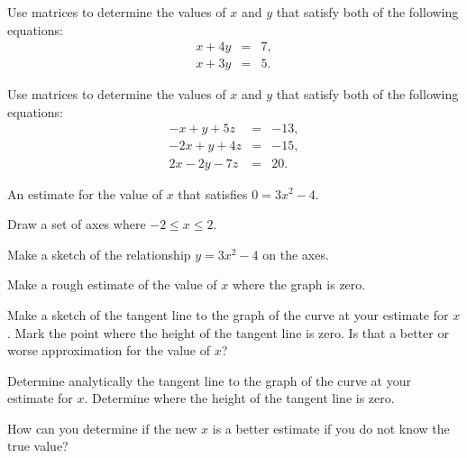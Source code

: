 \begin{problem}
\item Use matrices to determine the values of $x$ and $y$ that satisfy
  both of the following equations:
  \begin{eqnarray*}
    x + 4y & = & 7, \\
    x + 3y & = & 5.
  \end{eqnarray*}

  \vfill

  \clearpage

\item Use matrices to determine the values of $x$ and $y$ that satisfy
  both of the following equations:
  \begin{eqnarray*}
     -x +  y + 5z & = & -13, \\
    -2x +  y + 4z & = & -15, \\
     2x - 2y - 7z & = & 20.
  \end{eqnarray*}

  \vfill

  \clearpage

\item An estimate for the value of $x$ that satisfies $0=3x^2-4$.
  \begin{subproblem}
  \item Draw a set of axes where $-2\leq x \leq 2$. 


    \vfill

  \item Make a sketch of the relationship $y=3x^2-4$ on the axes.
  \item Make a rough estimate of the value of $x$ where the graph is zero.
    \clearpage

  \item Make a sketch of the tangent line to the graph of the curve
    at your estimate for $x$. Mark the point where the height of the
    tangent line is zero. Is that a better or worse approximation for
    the value of $x$?
    \vspace{2em}

  \item Determine analytically the tangent line to the graph of the curve
    at your estimate for $x$. Determine where the height of the
    tangent line is zero. 

    \vfill

  \item How can you determine if the new $x$ is a better estimate if
    you do not know the true value?

  \end{subproblem}

\end{problem}


